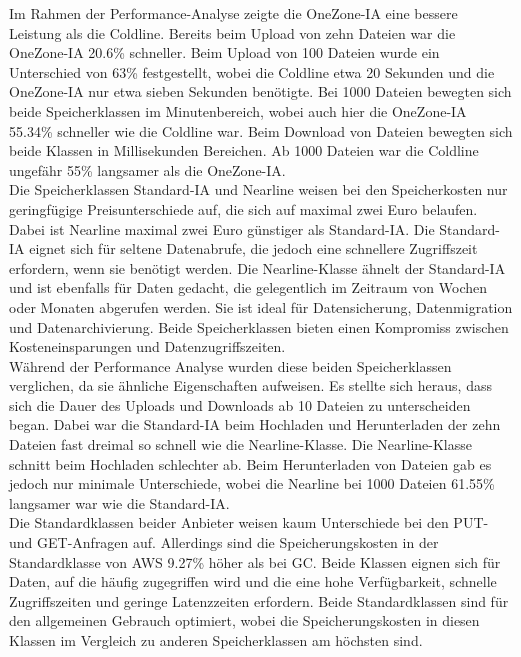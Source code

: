 Im Rahmen der Performance-Analyse zeigte die OneZone-IA eine bessere Leistung als die Coldline. Bereits beim Upload von zehn Dateien war die OneZone-IA 20.6\% schneller. Beim Upload von 100 Dateien wurde ein Unterschied von 63\% festgestellt, wobei die Coldline etwa 20 Sekunden und die OneZone-IA nur etwa sieben Sekunden benötigte. Bei 1000 Dateien bewegten sich beide Speicherklassen im Minutenbereich, wobei auch hier die OneZone-IA 55.34\% schneller wie die Coldline war. Beim Download von Dateien bewegten sich beide Klassen in Millisekunden Bereichen. Ab 1000 Dateien war die Coldline ungefähr 55\% langsamer als die OneZone-IA.\\

Die Speicherklassen Standard-IA und Nearline weisen bei den Speicherkosten nur geringfügige Preisunterschiede  auf, die sich auf maximal zwei Euro belaufen. Dabei ist Nearline maximal zwei Euro günstiger als Standard-IA. Die Standard-IA eignet sich für seltene Datenabrufe, die jedoch eine schnellere Zugriffszeit erfordern, wenn sie benötigt werden. Die Nearline-Klasse ähnelt der Standard-IA und ist ebenfalls für Daten gedacht, die gelegentlich im Zeitraum von Wochen oder Monaten abgerufen werden. Sie ist ideal für Datensicherung, Datenmigration und Datenarchivierung. Beide Speicherklassen bieten einen Kompromiss zwischen Kosteneinsparungen und Datenzugriffszeiten.\\

Während der Performance Analyse wurden diese beiden Speicherklassen verglichen, da sie ähnliche Eigenschaften aufweisen. Es stellte sich heraus, dass sich die Dauer des Uploads und Downloads ab 10 Dateien zu unterscheiden began. Dabei war die Standard-IA beim Hochladen und Herunterladen der zehn Dateien fast dreimal so schnell wie die Nearline-Klasse. Die Nearline-Klasse schnitt beim Hochladen schlechter ab. Beim Herunterladen von Dateien gab es jedoch nur minimale Unterschiede, wobei die Nearline bei 1000 Dateien 61.55\% langsamer war wie die Standard-IA.\\

Die Standardklassen beider Anbieter weisen kaum Unterschiede bei den PUT- und GET-Anfragen auf. Allerdings sind die Speicherungskosten in der Standardklasse von AWS 9.27\% höher als bei GC. Beide Klassen eignen sich für Daten, auf die häufig zugegriffen wird und die eine hohe Verfügbarkeit, schnelle Zugriffszeiten und geringe Latenzzeiten erfordern. Beide Standardklassen sind für den allgemeinen Gebrauch optimiert, wobei die Speicherungskosten in diesen Klassen im Vergleich zu anderen Speicherklassen am höchsten sind.\\


